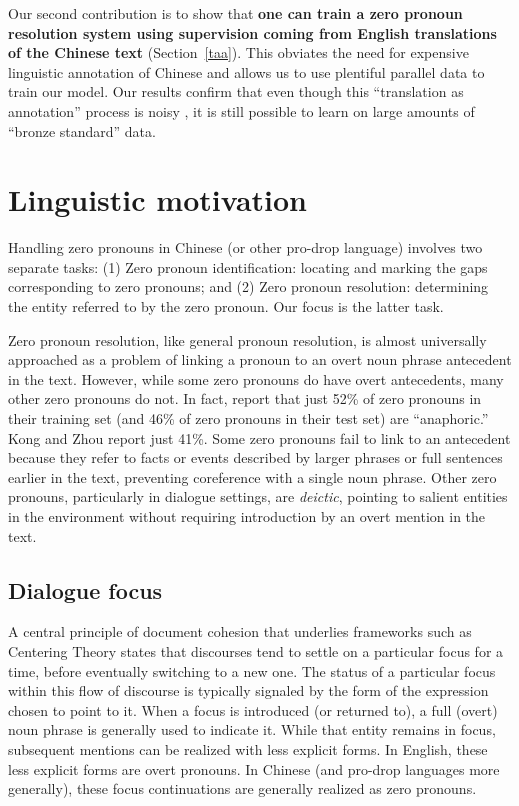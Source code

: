 \documentclass[11pt]{report}
\renewcommand\cite{\citep}	%
\begin{document}
Our second contribution is to show that \textbf{one can train a zero pronoun resolution system using supervision coming from English translations of the Chinese text} (Section~\ref{taa}). This obviates the need for expensive linguistic annotation of Chinese and allows us to use plentiful parallel data to train our model. Our results confirm that even though this ``translation as annotation'' process is noisy%
, it is still possible to learn on large amounts of ``bronze standard'' data.%

\section{Linguistic motivation} \label{ling}

Handling zero pronouns in Chinese (or other pro-drop language) involves two separate tasks: (1) Zero pronoun identification: locating and marking the gaps corresponding to zero pronouns; and (2) Zero pronoun resolution: determining the entity referred to by the zero pronoun. Our focus is the latter task.

Zero pronoun resolution, like general pronoun resolution, is almost universally approached as a problem of linking a pronoun to an overt noun phrase antecedent in the text. However, while some zero pronouns do have overt antecedents, many other zero pronouns do not. In fact, \cite{zhao2007identification} report that just 52\% of zero pronouns in their training set (and 46\% of zero pronouns in their test set) are ``anaphoric.'' Kong and Zhou \cite{kong2010tree} report just 41\%. Some zero pronouns fail to link to an antecedent because they refer to facts or events described by larger phrases or full sentences earlier in the text, preventing coreference with a single noun phrase. Other zero pronouns, particularly in dialogue settings, are \emph{deictic}, pointing to salient entities in the environment without requiring introduction by an overt mention in the text.%

\subsection{Dialogue focus}

A central principle of document cohesion that underlies frameworks such as Centering Theory \cite{grosz1995centering} states that discourses tend to settle on a particular focus for a time, before eventually switching to a new one. The status of a particular focus within this flow of discourse is typically signaled by the form of the expression chosen to point to it. When a focus is introduced (or returned to), a full (overt) noun phrase is generally used to indicate it. While that entity remains in focus, subsequent mentions can be realized with less explicit forms. In English, these less explicit forms are overt pronouns. In Chinese (and pro-drop languages more generally), these focus continuations are generally realized as zero pronouns.
\end{document}
